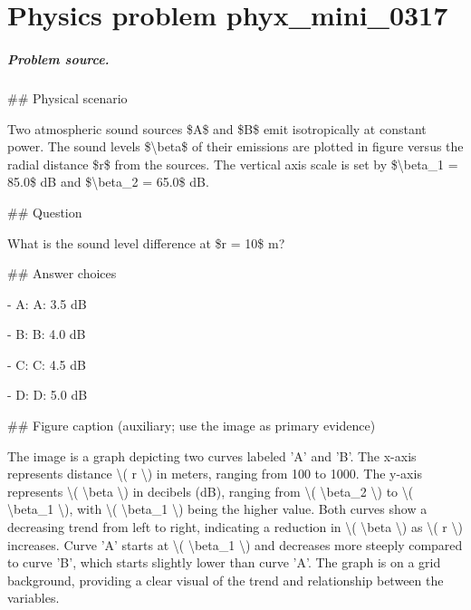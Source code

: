 
\chapter{Physics problem phyx\_mini\_0317}
\label{ch:PhyXMiniProblems_problem_phyx_mini_0317}

\paragraph{Problem source.}
\#\# Physical scenario

Two atmospheric sound sources \$A\$ and \$B\$ emit isotropically at constant power. The sound levels \$\textbackslash{}beta\$ of their emissions are plotted in figure versus the radial distance \$r\$ from the sources. The vertical axis scale is set by \$\textbackslash{}beta\_1 = 85.0\$ dB and \$\textbackslash{}beta\_2 = 65.0\$ dB.

\#\# Question

What is the sound level difference at \$r = 10\$ m?

\#\# Answer choices

- A: A: 3.5 dB

- B: B: 4.0 dB

- C: C: 4.5 dB

- D: D: 5.0 dB

\#\# Figure caption (auxiliary; use the image as primary evidence)

The image is a graph depicting two curves labeled 'A' and 'B'. The x-axis represents distance \textbackslash{}( r \textbackslash{}) in meters, ranging from 100 to 1000. The y-axis represents \textbackslash{}( \textbackslash{}beta \textbackslash{}) in decibels (dB), ranging from \textbackslash{}( \textbackslash{}beta\_2 \textbackslash{}) to \textbackslash{}( \textbackslash{}beta\_1 \textbackslash{}), with \textbackslash{}( \textbackslash{}beta\_1 \textbackslash{}) being the higher value. Both curves show a decreasing trend from left to right, indicating a reduction in \textbackslash{}( \textbackslash{}beta \textbackslash{}) as \textbackslash{}( r \textbackslash{}) increases. Curve 'A' starts at \textbackslash{}( \textbackslash{}beta\_1 \textbackslash{}) and decreases more steeply compared to curve 'B', which starts slightly lower than curve 'A'. The graph is on a grid background, providing a clear visual of the trend and relationship between the variables.

